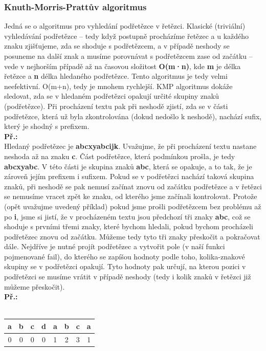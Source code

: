 \documentclass[12pt, a4paper]{article}
\begin{document}
			\subsubsection{Knuth-Morris-Prattův algoritmus}
				Jedná se o algoritmus pro vyhledání podřetězce v řetězci. Klasické (triviální) vyhledávání podřetězce – tedy když postupně procházíme řetězec a u každého znaku zjišťujeme, zda se shoduje s podřetězcem, a v případě neshody se posuneme na další znak a musíme porovnávat s podřetězcem zase od začátku – vede v nejhorším případě až na časovou složitost \textbf{O(m·n)}, kde \textbf{m} je délka řetězce a \textbf{n} délka hledaného podřetězce. Tento algoritmus je tedy velmi neefektivní. O(m+n), tedy je mnohem rychlejší. KMP algoritmus dokáže sledovat, zda se v hledaném podřetězci opakují určité skupiny znaků (podřetězce). Při procházení textu pak při neshodě zjistí, zda se v části podřetězce, která už byla zkontrolována (dokud nedošlo k neshodě), nachází sufix, který je shodný s prefixem.\\
				\textbf{Př.:}\\
				Hledaný podřetězec je \textbf{abcxyabcijk}. Uvažujme, že při procházení textu nastane neshoda až na znaku \textbf{c}. Část podřetězce, která podmínkou prošla, je tedy \textbf{abcxyabc}. V této části je skupina znaků \textbf{abc}, která se opakuje, a to tak, že je zároveň jejím prefixem i sufixem.
				Pokud se v podřetězci nachází taková skupina znaků, při neshodě se pak nemusí začínat znovu od začátku podřetězce a v řetězci se nemusíme vracet zpět ke znaku, od kterého jsme začínali kontrolovat. Protože (opět uvažujme uvedený příklad) pokud jsme prošli podřetězcem bez problému až po \textbf{i}, jsme si jistí, že v procházeném textu jsou předchozí tři znaky \textbf{abc}, což se shoduje s prvními třemi znaky, které bychom hledali, pokud bychom procházeli podřetězec znovu od začátku. Můžeme tedy tyto tři znaky přeskočit a pokračovat dále.
				Nejdříve je nutné projít podřetězec a vytvořit pole (v naší funkci pojmenované fail), do kterého se zapíšou hodnoty podle toho, kolika-znakové skupiny se v podřetězci opakují. Tyto hodnoty pak určují, na kterou pozici v podřetězci se musíme vrátit v případě neshody (tedy i kolik znaků v řetězci již můžeme přeskočit).\\
				\textbf{Př.:}\\\\
				\begin{center}
					\begin{tabular}{|c|c|c|c|c|c|c|c|}
						\hline
						a & b & c & d & a & b & c & a \\
						\hline
						0 & 0 & 0 & 0 & 1 & 2 & 3 & 1 \\
						\hline
					\end{tabular}\\
				\end{center}
\end{document}
